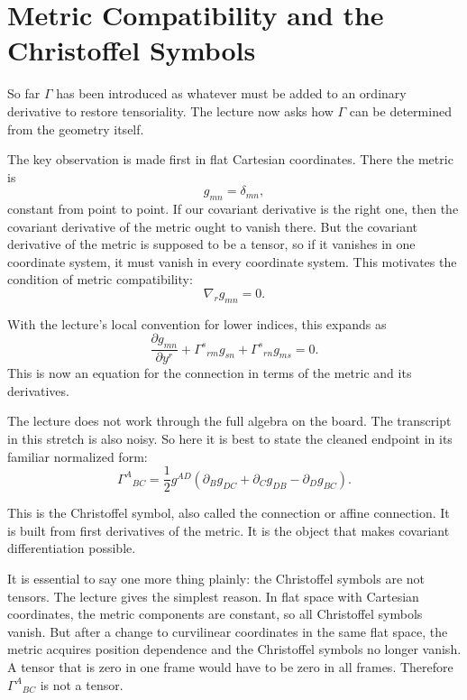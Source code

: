 \section{Metric Compatibility and the Christoffel Symbols}

So far \(\Gamma\) has been introduced as whatever must be added to an ordinary derivative to restore tensoriality. The lecture now asks how \(\Gamma\) can be determined from the geometry itself.

The key observation is made first in flat Cartesian coordinates. There the metric is
\begin{equation}
g_{mn}=\delta_{mn},
\end{equation}
constant from point to point. If our covariant derivative is the right one, then the covariant derivative of the metric ought to vanish there. But the covariant derivative of the metric is supposed to be a tensor, so if it vanishes in one coordinate system, it must vanish in every coordinate system. This motivates the condition of metric compatibility:
\begin{equation}
\nabla_r g_{mn}=0.
\end{equation}

With the lecture's local convention for lower indices, this expands as
\begin{equation}
\frac{\partial g_{mn}}{\partial y^r}
+
\Gamma^s{}_{rm}g_{sn}
+
\Gamma^s{}_{rn}g_{ms}
=
0.
\end{equation}
This is now an equation for the connection in terms of the metric and its derivatives.

The lecture does not work through the full algebra on the board. The transcript in this stretch is also noisy. So here it is best to state the cleaned endpoint in its familiar normalized form:
\begin{equation}
\Gamma^A{}_{BC}
=
\frac{1}{2}g^{AD}
\left(
\partial_B g_{DC}
+
\partial_C g_{DB}
-
\partial_D g_{BC}
\right).
\end{equation}

This is the Christoffel symbol, also called the connection or affine connection. It is built from first derivatives of the metric. It is the object that makes covariant differentiation possible.

It is essential to say one more thing plainly: the Christoffel symbols are not tensors. The lecture gives the simplest reason. In flat space with Cartesian coordinates, the metric components are constant, so all Christoffel symbols vanish. But after a change to curvilinear coordinates in the same flat space, the metric acquires position dependence and the Christoffel symbols no longer vanish. A tensor that is zero in one frame would have to be zero in all frames. Therefore \(\Gamma^A{}_{BC}\) is not a tensor.

